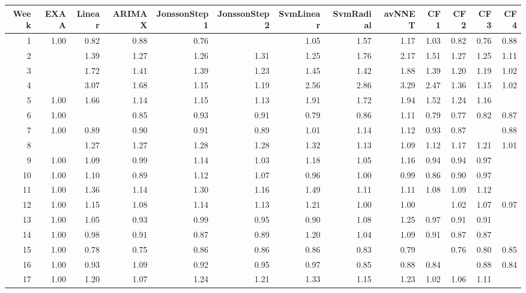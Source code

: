 \begin{tabular}{rrrrrrrrrrrrr}
  \hline
Week & EXAA & Linear & ARIMAX & JonssonStep1 & JonssonStep2 & SvmLinear & SvmRadial & avNNET & CF1 & CF2 & CF3 & CF4 \\ 
  \hline
1 & 1.00 & 0.82 & 0.88 & 0.76 & \color{blue}{0.74} & 1.05 & 1.57 & 1.17 & 1.03 & 0.82 & 0.76 & 0.88 \\ 
  2 & \color{blue}{1.00} & 1.39 & 1.27 & 1.26 & 1.31 & 1.25 & 1.76 & 2.17 & 1.51 & 1.27 & 1.25 & 1.11 \\ 
  3 & \color{blue}{1.00} & 1.72 & 1.41 & 1.39 & 1.23 & 1.45 & 1.42 & 1.88 & 1.39 & 1.20 & 1.19 & 1.02 \\ 
  4 & \color{blue}{1.00} & 3.07 & 1.68 & 1.15 & 1.19 & 2.56 & 2.86 & 3.29 & 2.47 & 1.36 & 1.15 & 1.02 \\ 
  5 & 1.00 & 1.66 & 1.14 & 1.15 & 1.13 & 1.91 & 1.72 & 1.94 & 1.52 & 1.24 & 1.16 & \color{blue}{0.97} \\ 
  6 & 1.00 & \color{blue}{0.75} & 0.85 & 0.93 & 0.91 & 0.79 & 0.86 & 1.11 & 0.79 & 0.77 & 0.82 & 0.87 \\ 
  7 & 1.00 & 0.89 & 0.90 & 0.91 & 0.89 & 1.01 & 1.14 & 1.12 & 0.93 & 0.87 & \color{blue}{0.87} & 0.88 \\ 
  8 & \color{blue}{1.00} & 1.27 & 1.27 & 1.28 & 1.28 & 1.32 & 1.13 & 1.09 & 1.12 & 1.17 & 1.21 & 1.01 \\ 
  9 & 1.00 & 1.09 & 0.99 & 1.14 & 1.03 & 1.18 & 1.05 & 1.16 & 0.94 & 0.94 & 0.97 & \color{blue}{0.93} \\ 
  10 & 1.00 & 1.10 & 0.89 & 1.12 & 1.07 & 0.96 & 1.00 & 0.99 & 0.86 & 0.90 & 0.97 & \color{blue}{0.85} \\ 
  11 & 1.00 & 1.36 & 1.14 & 1.30 & 1.16 & 1.49 & 1.11 & 1.11 & 1.08 & 1.09 & 1.12 & \color{blue}{0.96} \\ 
  12 & 1.00 & 1.15 & 1.08 & 1.14 & 1.13 & 1.21 & 1.00 & 1.00 & \color{blue}{0.96} & 1.02 & 1.07 & 0.97 \\ 
  13 & 1.00 & 1.05 & 0.93 & 0.99 & 0.95 & 0.90 & 1.08 & 1.25 & 0.97 & 0.91 & 0.91 & \color{blue}{0.90} \\ 
  14 & 1.00 & 0.98 & 0.91 & 0.87 & 0.89 & 1.20 & 1.04 & 1.09 & 0.91 & 0.87 & 0.87 & \color{blue}{0.85} \\ 
  15 & 1.00 & 0.78 & 0.75 & 0.86 & 0.86 & 0.86 & 0.83 & 0.79 & \color{blue}{0.74} & 0.76 & 0.80 & 0.85 \\ 
  16 & 1.00 & 0.93 & 1.09 & 0.92 & 0.95 & 0.97 & 0.85 & 0.88 & 0.84 & \color{blue}{0.83} & 0.88 & 0.84 \\ 
  17 & 1.00 & 1.20 & 1.07 & 1.24 & 1.21 & 1.33 & 1.15 & 1.23 & 1.02 & 1.06 & 1.11 & \color{blue}{0.88} \\ 

\end{tabular}
